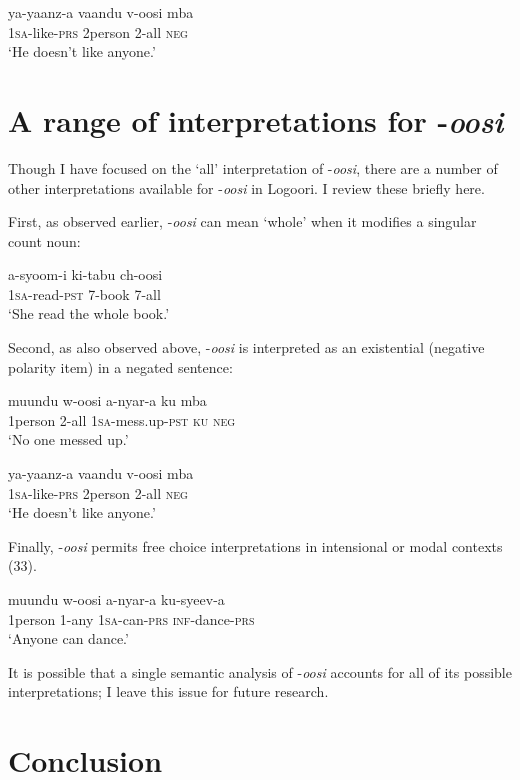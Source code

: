 \documentclass[output=paper]{langsci/langscibook}
\begin{document}
\ea
\gll ya-yaanz-a  vaandu   v-oosi    mba \\
     1\textsc{sa}{}-like-\textsc{prs}  2person     2-all    \textsc{neg}\\
\glt ‘He doesn't like anyone.’
\z

\section{A range of interpretations for -\textit{oosi}}

Though I have focused on the ‘all’ interpretation of -\textit{oosi}, there are a number of other interpretations available for -\textit{oosi} in Logoori. I review these briefly here.

  First, as observed earlier, -\textit{oosi} can mean ‘whole’ when it modifies a singular count noun:

\ea
\gll a-syoom-i  ki-tabu  ch-oosi\\
     1\textsc{sa}{}-read-\textsc{pst}    7-book\textsc{  7-}all \\
\glt ‘She read the whole book.’
\z

  Second, as also observed above, -\textit{oosi} is interpreted as an existential (negative polarity item) in a negated sentence:  

\ea 
\gll muundu  w-oosi    a-nyar-a    ku  mba  \\
     1person  2-all    1\textsc{sa}{}-mess.up-\textsc{pst}  \textsc{ku  neg}\\
\glt ‘No one messed up.’       \textit{} 
\z

\ea
\gll ya-yaanz-a  vaandu   v-oosi    mba \\
     1\textsc{sa}{}-like-\textsc{prs}  2person     2-all    \textsc{neg}\\
\glt ‘He doesn't like anyone.’
\z

  Finally, -\textit{oosi} permits free choice interpretations in intensional or modal contexts (33).

\ea
\gll muundu  w-oosi    a-nyar-a  ku-syeev-a\\
     1person  1-any    1\textsc{sa}{}-can-\textsc{prs  inf-}dance-\textsc{prs} \\
\glt ‘Anyone can dance.’
\z

  It is possible that a single semantic analysis of -\textit{oosi} accounts for all of its possible interpretations; I leave this issue for future research. 

\section{Conclusion}
\end{document}
